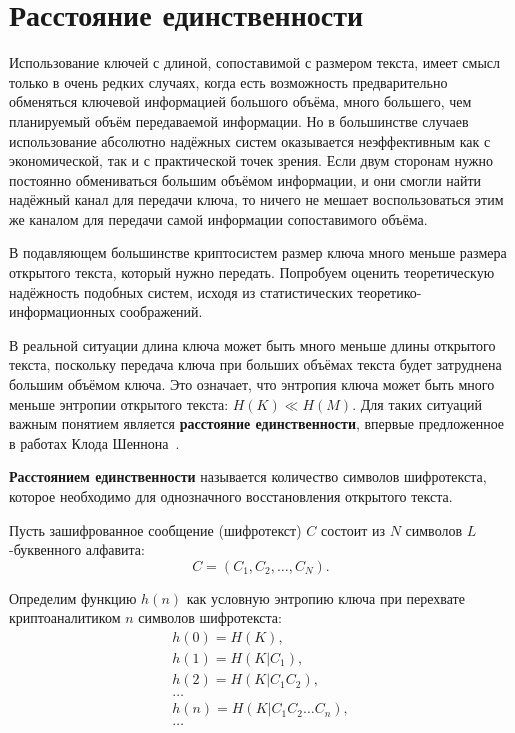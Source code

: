\section{Расстояние единственности}\label{section_unicity_distance}

Использование ключей с длиной, сопоставимой с размером текста, имеет смысл только в очень редких случаях, когда есть возможность предварительно обменяться ключевой информацией большого объёма, много большего, чем планируемый объём передаваемой информации. Но в большинстве случаев использование абсолютно надёжных систем оказывается неэффективным как с экономической, так и с практической точек зрения. Если двум сторонам нужно постоянно обмениваться большим объёмом информации, и они смогли найти надёжный канал для передачи ключа, то ничего не мешает воспользоваться этим же каналом для передачи самой информации сопоставимого объёма.

В подавляющем большинстве криптосистем размер ключа много меньше размера открытого текста, который нужно передать. Попробуем оценить теоретическую надёжность подобных систем, исходя из статистических теоретико-информационных соображений.

В реальной ситуации длина ключа может быть много меньше длины открытого текста, поскольку передача ключа при больших объёмах текста будет затруднена большим объёмом ключа. Это означает, что энтропия ключа может быть много меньше энтропии открытого текста: $H(K) \ll H(M)$. Для таких ситуаций важным понятием является \textbf{расстояние единственности}, впервые предложенное в работах Клода Шеннона~\cite{Golomb:2002, Schneier:2011}.

\begin{definition}\label{definition:unicity_distance}
\textbf{Расстоянием единственности} называется количество символов шифротекста, которое необходимо для однозначного восстановления открытого текста.
\end{definition}

Пусть зашифрованное сообщение (шифротекст) $C$ состоит из $N$ символов $L$-буквенного алфавита:
	\[C = (C_1, C_2, \dots, C_N).\]

Определим функцию $h(n)$ как условную энтропию ключа при перехвате криптоаналитиком $n$ символов шифротекста:
\[ \begin{array}{l}
    h ( 0 ) = H(K), \\
    h ( 1 ) = H(K | C_1), \\
    h ( 2 ) = H(K | C_1 C_2), \\
    \dots \\
    h ( n ) = H(K | C_1 C_2 \dots C_n), \\
    \dots
\end{array} \]

